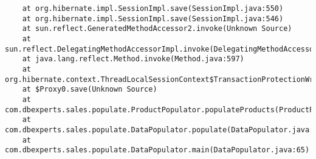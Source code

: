 \begin{verbatim}
	at org.hibernate.impl.SessionImpl.save(SessionImpl.java:550)
	at org.hibernate.impl.SessionImpl.save(SessionImpl.java:546)
	at sun.reflect.GeneratedMethodAccessor2.invoke(Unknown Source)
	at sun.reflect.DelegatingMethodAccessorImpl.invoke(DelegatingMethodAccessorImpl.java:25)
	at java.lang.reflect.Method.invoke(Method.java:597)
	at org.hibernate.context.ThreadLocalSessionContext$TransactionProtectionWrapper.invoke(ThreadLocalSessionContext.java:342)
	at $Proxy0.save(Unknown Source)
	at com.dbexperts.sales.populate.ProductPopulator.populateProducts(ProductPopulator.java:30)
	at com.dbexperts.sales.populate.DataPopulator.populate(DataPopulator.java:47)
	at com.dbexperts.sales.populate.DataPopulator.main(DataPopulator.java:65)
\end{verbatim}